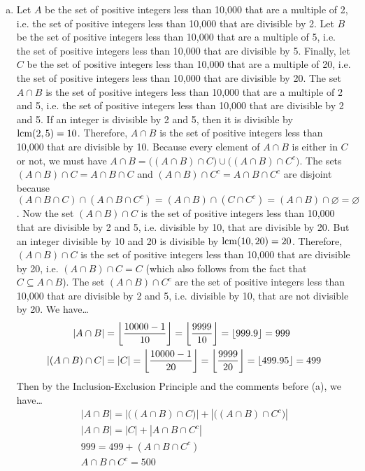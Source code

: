 \documentclass[11pt,letterpaper]{article}
\begin{document}
\begin{enumerate}[(a)]
\item Let $A$ be the set of positive integers less than 10,000 that are a multiple of 2, i.e. the set of positive integers less than 10,000 that are divisible by 2.  Let $B$ be the set of positive integers less than 10,000 that are a multiple of 5, i.e. the set of positive integers less than 10,000 that are divisible by 5. Finally,  let $C$ be the set of positive integers less than 10,000 that are a multiple of 20, i.e. the set of positive integers less than 10,000 that are divisible by 20. The set $A \cap B$ is the set of positive integers less than 10,000 that are a multiple of 2 and 5, i.e. the set of positive integers less than 10,000 that are divisible by 2 and 5. If an integer is divisible by 2 and 5, then it is divisible by $\lcm(2, 5)= 10$. Therefore, $A \cap B$ is the set of positive integers less than 10,000 that are divisible by 10. Because every element of $A \cap B$ is either in $C$ or not, we must have $A \cap B= \big( (A \cap B) \cap C \big) \cup \big( (A \cap B) \cap C^c \big)$. The sets $(A \cap B) \cap C= A \cap B \cap C$ and $(A \cap B) \cap C^c= A \cap B \cap C^c$ are disjoint because $(A \cap B \cap C) \cap (A \cap B \cap C^c)= (A \cap B) \cap (C \cap C^c)= (A \cap B) \cap \varnothing= \varnothing$. Now the set $(A \cap B) \cap C$ is the set of positive integers less than 10,000 that are divisible by 2 and 5, i.e. divisible by 10, that are divisible by 20. But an integer divisible by 10 and 20 is divisible by $\lcm(10, 20)= 20$. Therefore, $(A \cap B) \cap C$ is the set of positive integers less than 10,000 that are divisible by 20, i.e. $(A \cap B) \cap C= C$ (which also follows from the fact that $C \subseteq A \cap B$). The set $(A \cap B) \cap C^c$ are the set of positive integers less than 10,000 that are divisible by 2 and 5, i.e. divisible by 10, that are not divisible by 20. We have\dots
	\[
	\begin{aligned}
	|A \cap B|&= \floor*{\dfrac{10000 - 1}{10}}= \floor*{\dfrac{9999}{10}}= \floor*{999.9}= 999 \\
	|(A \cap B) \cap C|&= |C|= \floor*{\dfrac{10000 - 1}{20}}= \floor*{\dfrac{9999}{20}}= \floor*{499.95}= 499
	\end{aligned}
	\]
Then by the Inclusion-Exclusion Principle and the comments before (a), we have\dots
	\[
	\begin{gathered}
	|A \cap B|= |\big( (A \cap B) \cap C \big)| + |\big( (A \cap B) \cap C^c \big)| \\
	|A \cap B|= |C| + |A \cap B \cap C^c| \\
	999= 499 + (A \cap B \cap C^c) \\
	A \cap B \cap C^c= 500
	\end{gathered}
	\]


\end{enumerate}
\end{document}
